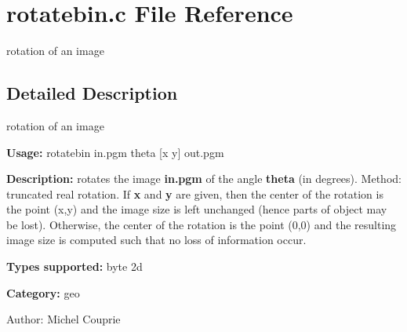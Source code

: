 \section{rotatebin.c File Reference}
\label{rotatebin_8c}
rotation of an image  




\label{_details}
\subsection{Detailed Description}
rotation of an image 

{\bf Usage:} rotatebin in.pgm theta [x y] out.pgm

{\bf Description:} rotates the image {\bf in.pgm} of the angle {\bf theta} (in degrees). Method: truncated real rotation. If {\bf x} and {\bf y} are given, then the center of the rotation is the point (x,y) and the image size is left unchanged (hence parts of object may be lost). Otherwise, the center of the rotation is the point (0,0) and the resulting image size is computed such that no loss of information occur.

{\bf Types supported:} byte 2d

{\bf Category:} geo

\begin{Desc}
\item[Author:]Michel Couprie \end{Desc}
